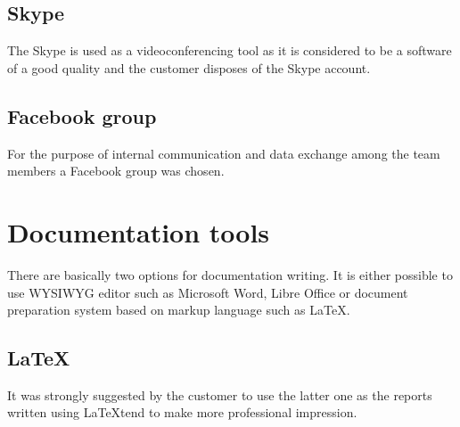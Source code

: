 
\subsection{Skype}
The Skype is used as a videoconferencing tool as it is considered to be a software of a good quality and the customer disposes of the Skype account.


\subsection{Facebook group}
For the purpose of internal communication and data exchange among the team members a Facebook group was chosen.


\section{Documentation tools} 
\label{sec:documentation_tools}

There are basically two options for documentation writing. It is either possible to use WYSIWYG editor such as Microsoft Word, Libre Office or document preparation system based on markup language such as \LaTeX.

\subsection{\LaTeX}

It was strongly suggested by the customer to use the latter one as the reports written using \LaTeX  tend to make more professional impression.


